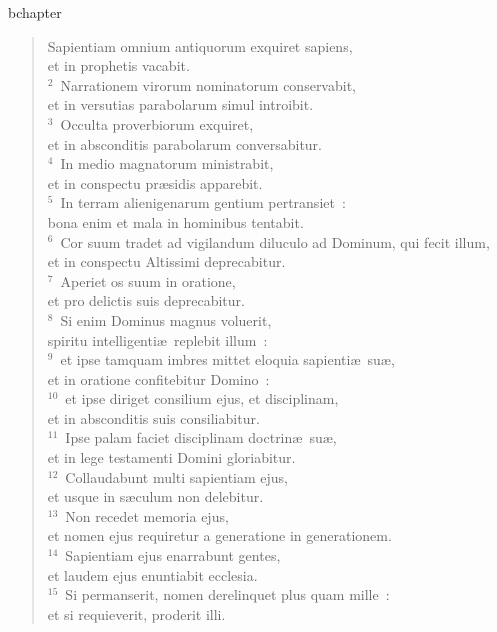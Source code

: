 bchapter\begin{verse}\vspace{-19pt}Sapientiam omnium antiquorum exquiret sapiens,\\ et in prophetis vacabit.\\
${}^{2}$~Narrationem virorum nominatorum conservabit,\\ et in versutias parabolarum simul introibit.\\
${}^{3}$~Occulta proverbiorum exquiret,\\ et in absconditis parabolarum conversabitur.\\
${}^{4}$~In medio magnatorum ministrabit,\\ et in conspectu pr\ae sidis apparebit.\\
${}^{5}$~In terram alienigenarum gentium pertransiet~:\\ bona enim et mala in hominibus tentabit.\\
${}^{6}$~Cor suum tradet ad vigilandum diluculo ad Dominum, qui fecit illum,\\ et in conspectu Altissimi deprecabitur.\\
${}^{7}$~Aperiet os suum in oratione,\\ et pro delictis suis deprecabitur.\\
${}^{8}$~Si enim Dominus magnus voluerit,\\ spiritu intelligenti\ae\ replebit illum~:\\
${}^{9}$~et ipse tamquam imbres mittet eloquia sapienti\ae\ su\ae ,\\ et in oratione confitebitur Domino~:\\
${}^{10}$~et ipse diriget consilium ejus, et disciplinam,\\ et in absconditis suis consiliabitur.\\
${}^{11}$~Ipse palam faciet disciplinam doctrin\ae\ su\ae ,\\ et in lege testamenti Domini gloriabitur.\\
${}^{12}$~Collaudabunt multi sapientiam ejus,\\ et usque in s\ae culum non delebitur.\\
${}^{13}$~Non recedet memoria ejus,\\ et nomen ejus requiretur a generatione in generationem.\\
${}^{14}$~Sapientiam ejus enarrabunt gentes,\\ et laudem ejus enuntiabit ecclesia.\\
${}^{15}$~Si permanserit, nomen derelinquet plus quam mille~:\\ et si requieverit, proderit illi.\end{verse}


